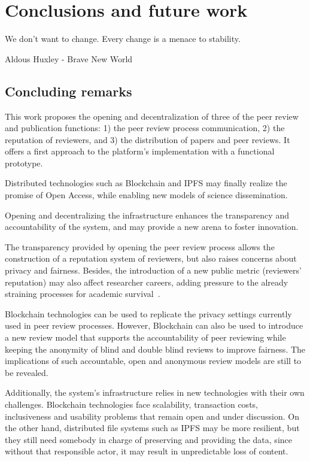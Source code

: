 \chapter{Conclusions and future work}

\begin{FraseCelebre}
  \begin{Frase}
    We don't want to change. Every change is a menace to stability.
  \end{Frase}
  \begin{Fuente}
    Aldous Huxley - Brave New World
  \end{Fuente}
\end{FraseCelebre}

\section{Concluding remarks}

This work proposes the opening and decentralization of three of the peer review
and publication functions: 1) the peer review process communication, 2) the
reputation of reviewers, and 3) the distribution of papers and peer reviews. It
offers a first approach to the platform's implementation with a functional
prototype.

Distributed technologies such as Blockchain and IPFS may finally realize the
promise of Open Access, while enabling new models of science dissemination.

Opening and decentralizing the infrastructure enhances the transparency and
accountability of the system, and may provide a new arena to foster innovation.


The transparency provided by opening the peer review process allows the
construction of a reputation system of reviewers, but also raises concerns about
privacy and fairness. Besides, the introduction of a new public metric
(reviewers' reputation) may also affect researcher careers, adding pressure to
the already straining processes for academic survival~\cite{de2005publish}.

Blockchain technologies can be used to replicate the privacy settings currently
used in peer review processes. However, Blockchain can also be used to introduce
a new review model that supports the accountability of peer reviewing while
keeping the anonymity of blind and double blind reviews to improve fairness. The
implications of such accountable, open and anonymous review models are still to
be revealed.

Additionally, the system's infrastructure relies in new technologies with their
own challenges. Blockchain technologies face scalability, transaction costs,
inclusiveness and usability problems that remain open and under discussion. On
the other hand, distributed file systems such as IPFS may be more resilient, but
they still need somebody in charge of preserving and providing the data, since
without that responsible actor, it may result in unpredictable loss of content.


